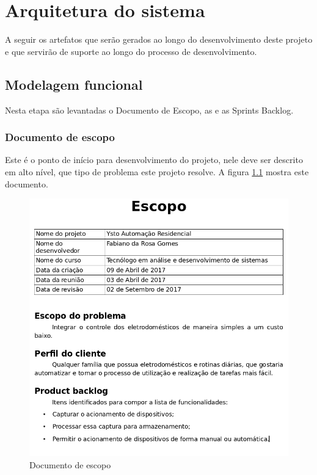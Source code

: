 \chapter{Arquitetura do sistema}

A seguir os artefatos que serão gerados ao longo do desenvolvimento deste projeto e que servirão de suporte ao longo do processo de desenvolvimento.

\section{Modelagem funcional}
Nesta etapa são levantadas o Documento de Escopo, as e as Sprints Backlog.

\subsection{Documento de escopo}
Este é o ponto de início para desenvolvimento do projeto, nele deve ser descrito em alto nível, que tipo de problema este projeto resolve. A figura \ref{doc-escopo} mostra este documento.

\begin{figure}[H]
\caption{\label{doc-escopo} Documento de escopo}
\includegraphics[scale=0.33]{img/escopo.png}
\end{figure}

